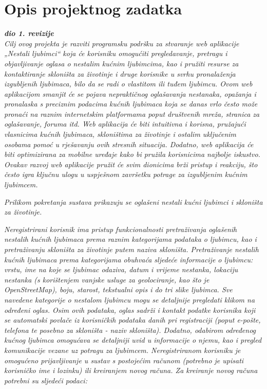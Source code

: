 \chapter{Opis projektnog zadatka}
		
		\textbf{\textit{dio 1. revizije}}\\
		
		\textit{Cilj ovog projekta je razviti programsku podršku za stvaranje web aplikacije „Nestali ljubimci“ koja će korisniku omogućiti pregledavanje, pretragu i objavljivanje oglasa o nestalim kućnim ljubimcima, kao i pružiti resurse za kontaktiranje skloništa za životinje i druge korisnike u svrhu pronalaženja izgubljenih ljubimaca, bilo da se radi o vlastitom ili tuđem ljubimcu. Ovom web aplikacijom smanjit će se pojava nepraktičnog oglašavanja nestanaka, opažanja i pronalaska s preciznim podacima kućnih ljubimaca koja se danas vrlo često može pronaći na raznim internetskim platformama poput društvenih mreža, stranica za oglašavanje, foruma itd. Web aplikacija će biti intuitivna i korisna, pružajući vlasnicima kućnih ljubimaca, skloništima za životinje i ostalim uključenim osobama pomoć u rješavanju ovih stresnih situacija. Dodatno, web aplikacija će biti optimizirana za mobilne uređaje kako bi pružila korisnicima najbolje iskustvo. Ovakav razvoj web aplikacije pružit će svim dionicima brži pristup i reakciju, što često igra ključnu ulogu u uspješnom završetku potrage za izgubljenim kućnim ljubimcem.}
		
		\textit{Prilikom pokretanja sustava prikazuju se oglašeni nestali kućni ljubimci i skloništa za životinje.}
		
		\textit{Neregistrirani korisnik ima pristup funkcionalnosti pretraživanja oglašenih nestalih kućnih ljubimaca prema raznim kategorijama podataka o ljubimcu, kao i pretraživanju skloništa za životinje putem naziva skloništa. Pretraživanje nestalih kućnih ljubimaca prema kategorijama obuhvaća sljedeće informacije o ljubimcu: vrstu, ime na koje se ljubimac odaziva, datum i vrijeme nestanka, lokaciju nestanka (s korištenjem vanjske usluge za geolociranje, kao što je OpenStreetMap), boju, starost, tekstualni opis i do tri slike ljubimca. Sve navedene kategorije o nestalom ljubimcu mogu se detaljnije pregledati klikom na određeni oglas. Osim ovih podataka, oglas sadrži i kontakt podatke korisnika koji se automatski povlače iz korisničkih podataka danih pri registraciji (poput e-pošte, telefona te posebno za skloništa - naziv skloništa). Dodatno, odabirom određenog kućnog ljubimca omogućava se detaljniji uvid u informacije o njemu, kao i pregled komunikacije vezane uz potragu za ljubimcem. Neregistriranom korisniku je omogućeno prijavljivanje u sustav s postojećim računom (potrebno je upisati korisničko ime i lozinku) ili kreiranjem novog računa. Za kreiranje novog računa potrebni su sljedeći podaci:}
		
